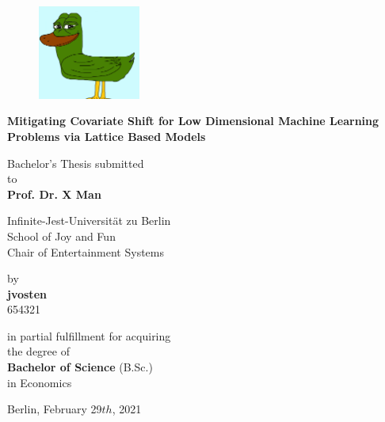 \begin{center}
	
		\begin{figure}[htb!]
			\centering
			\includegraphics[width=0.3\textwidth]{img/pepe}
		\end{figure}
	\vspace*{0.5cm}
	
	{\Large{\bf Mitigating Covariate Shift for Low Dimensional Machine Learning Problems via Lattice Based Models}} \vspace{0.5cm}
	
	
	{\normalsize Bachelor's Thesis submitted\\\vspace{0.5cm}
		to}\\\vspace{0.5cm}
	{\normalsize{\bf Prof. Dr. X Man}} \\\vspace{0.5cm}
	
	{\normalsize Infinite-Jest-Universität zu Berlin \\
		School of Joy and Fun \\
		Chair of Entertainment Systems}  \vspace{1cm}
	
	
	{\normalsize by \\\vspace{0.5cm}
		{\bf jvosten} \\
		654321 \vspace{1cm}}
	
	
	{\normalsize in partial fulfillment for acquiring \\
		the degree of \\
		{\bf Bachelor of Science} (B.Sc.) \\
		in Economics \vspace*{0.75cm}
		
		Berlin, February 29$th$, 2021}
	
\end{center}